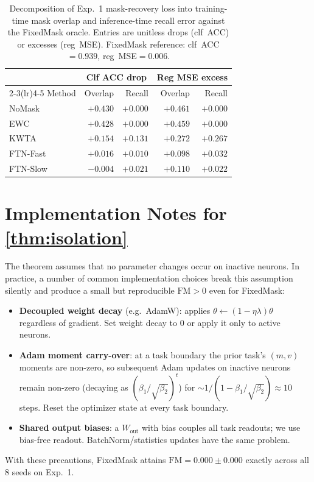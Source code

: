 \documentclass{article}
\theoremstyle{plain}
\theoremstyle{remark}
\begin{document}
\begin{table}[h]
\caption{Decomposition of Exp.~1 mask-recovery loss into training-time mask overlap and inference-time recall error against the FixedMask oracle. Entries are unitless drops (clf~ACC) or excesses (reg~MSE). FixedMask reference: clf~ACC$=0.939$, reg~MSE$=0.006$.}
\label{tab:overlap_recall}
\vskip 0.05in
\begin{center}\begin{small}
\begin{tabular}{lrrrr}
\toprule
 & \multicolumn{2}{c}{Clf ACC drop} & \multicolumn{2}{c}{Reg MSE excess} \\
\cmidrule(lr){2-3}\cmidrule(lr){4-5}
Method & Overlap & Recall & Overlap & Recall \\
\midrule
NoMask    & $+0.430$ & $+0.000$ & $+0.461$ & $+0.000$ \\
EWC       & $+0.428$ & $+0.000$ & $+0.459$ & $+0.000$ \\
KWTA      & $+0.154$ & $+0.131$ & $+0.272$ & $+0.267$ \\
FTN-Fast  & $+0.016$ & $+0.010$ & $+0.098$ & $+0.032$ \\
FTN-Slow  & $-0.004$ & $+0.021$ & $+0.110$ & $+0.022$ \\
\bottomrule
\end{tabular}
\end{small}\end{center}
\end{table}

\section{Implementation Notes for \cref{thm:isolation}}
\label{app:impl}
The theorem assumes that no parameter changes occur on inactive neurons. In practice, a number of common implementation choices break this assumption silently and produce a small but reproducible $\mathrm{FM}>0$ even for FixedMask:
\begin{itemize}
\item \textbf{Decoupled weight decay} (e.g.\ AdamW): applies $\theta\leftarrow(1-\eta\lambda)\theta$ regardless of gradient. Set weight decay to $0$ or apply it only to active neurons.
\item \textbf{Adam moment carry-over}: at a task boundary the prior task's $(m,v)$ moments are non-zero, so subsequent Adam updates on inactive neurons remain non-zero (decaying as $(\beta_1/\sqrt{\beta_2})^t$) for $\sim 1/(1-\beta_1/\sqrt{\beta_2})\approx 10$ steps. Reset the optimizer state at every task boundary.
\item \textbf{Shared output biases}: a $W_\mathrm{out}$ with bias couples all task readouts; we use bias-free readout. BatchNorm/statistics updates have the same problem.
\end{itemize}
With these precautions, FixedMask attains $\mathrm{FM}=0.000\pm 0.000$ exactly across all 8 seeds on Exp.~1.
\end{document}
